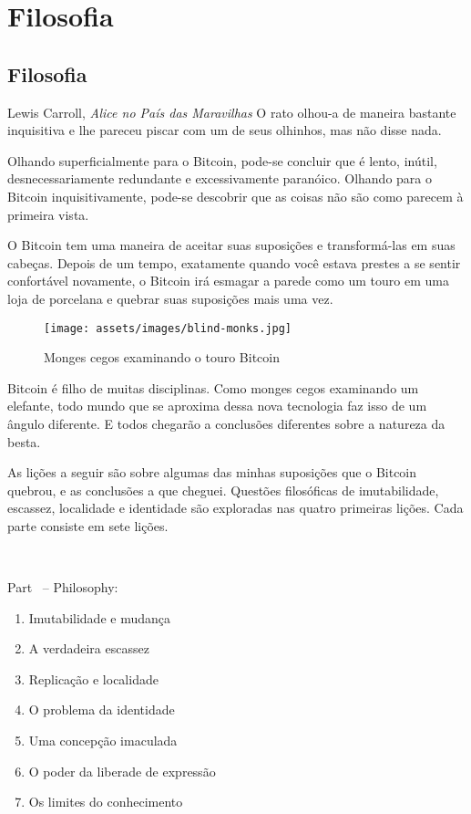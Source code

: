 \part{Filosofia}
\label{ch:philosophy}
\chapter*{Filosofia}

\begin{chapquote}{Lewis Carroll, \textit{Alice no País das Maravilhas}}
O rato olhou-a de maneira bastante inquisitiva e lhe pareceu piscar com um
de seus olhinhos, mas não disse nada.
\end{chapquote}

Olhando superficialmente para o Bitcoin, pode-se concluir que é lento, inútil,
desnecessariamente redundante e excessivamente paranóico. Olhando para o Bitcoin inquisitivamente,
pode-se descobrir que as coisas não são como parecem à primeira vista.

O Bitcoin tem uma maneira de aceitar suas suposições e transformá-las em suas cabeças.
Depois de um tempo, exatamente quando você estava prestes a se sentir confortável novamente, o Bitcoin irá
esmagar a parede como um touro em uma loja de porcelana e quebrar suas suposições
mais uma vez.

\begin{figure}
  \texttt{[image: assets/images/blind-monks.jpg]}
  \caption{Monges cegos examinando o touro Bitcoin}
  \label{fig:blind-monks}
\end{figure}

Bitcoin é filho de muitas disciplinas. Como monges cegos examinando um elefante,
todo mundo que se aproxima dessa nova tecnologia faz isso de um ângulo diferente.
E todos chegarão a conclusões diferentes sobre a natureza da besta.

As lições a seguir são sobre algumas das minhas suposições que o Bitcoin quebrou,
e as conclusões a que cheguei. Questões filosóficas de imutabilidade,
escassez, localidade e identidade são exploradas nas quatro primeiras lições. Cada
parte consiste em sete lições.

~

\begin{samepage}
Part~\ref{ch:philosophy} -- Philosophy:

\begin{enumerate}
  \item Imutabilidade e mudança
  \item A verdadeira escassez
  \item Replicação e localidade
  \item O problema da identidade
  \item Uma concepção imaculada
  \item O poder da liberade de expressão
  \item Os limites do conhecimento
\end{enumerate}
\end{samepage}

